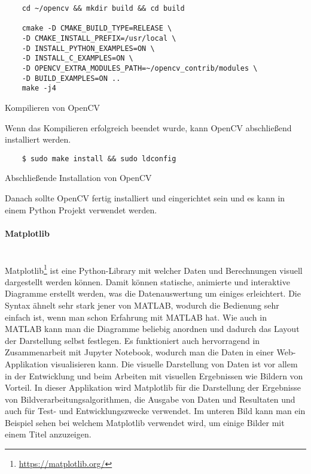 \begin{listing}[H]
    \begin{verbatim}
    cd ~/opencv && mkdir build && cd build

    cmake -D CMAKE_BUILD_TYPE=RELEASE \
    -D CMAKE_INSTALL_PREFIX=/usr/local \
    -D INSTALL_PYTHON_EXAMPLES=ON \
    -D INSTALL_C_EXAMPLES=ON \
    -D OPENCV_EXTRA_MODULES_PATH=~/opencv_contrib/modules \
    -D BUILD_EXAMPLES=ON ..
    make -j4
    \end{verbatim}
    \caption{Kompilieren von OpenCV}
\end{listing}

Wenn das Kompilieren erfolgreich beendet wurde, kann OpenCV abschließend installiert werden.

\begin{listing}[H]
    \begin{verbatim}
    $ sudo make install && sudo ldconfig
    \end{verbatim}
    \caption{Abschließende Installation von OpenCV}
\end{listing}

Danach sollte OpenCV fertig installiert und eingerichtet sein und es kann in einem Python Projekt verwendet werden.

\paragraph{Matplotlib}\mbox{}\\
Matplotlib\footnote{\url{https://matplotlib.org/}} ist eine Python-Library mit welcher Daten und Berechnungen visuell dargestellt werden können. Damit können 
statische, animierte und interaktive Diagramme erstellt werden, was die Datenauswertung um einiges erleichtert. 
Die Syntax ähnelt sehr stark jener von MATLAB, wodurch die Bedienung sehr einfach ist, wenn man schon Erfahrung mit 
MATLAB hat. Wie auch in MATLAB kann man die Diagramme beliebig anordnen und dadurch das Layout der Darstellung selbst 
festlegen. Es funktioniert auch hervorragend in Zusammenarbeit mit Jupyter Notebook, wodurch man die Daten in einer 
Web-Applikation visualisieren kann. Die visuelle Darstellung von Daten ist vor allem in der Entwicklung und beim 
Arbeiten mit visuellen Ergebnissen wie Bildern von Vorteil. In dieser Applikation wird Matplotlib für die Darstellung 
der Ergebnisse von Bildverarbeitungsalgorithmen, die Ausgabe von Daten und Resultaten und auch für Test- und 
Entwicklungszwecke verwendet. Im unteren Bild kann man ein Beispiel sehen bei welchem Matplotlib verwendet wird, 
um einige Bilder mit einem Titel anzuzeigen.

